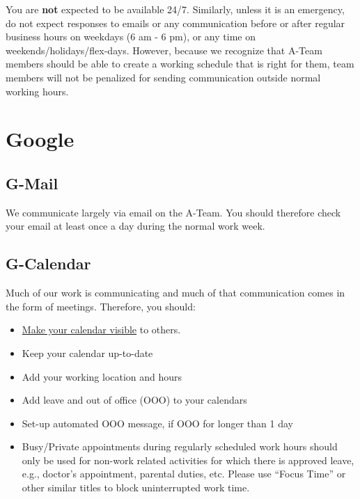 \documentclass[
  letterpaper,
  DIV=11,
  numbers=noendperiod]{scrreprt}
\providecommand{\tightlist}{%
  \setlength{\itemsep}{0pt}\setlength{\parskip}{0pt}}\usepackage{longtable,booktabs,array}
\begin{document}
You are \textbf{not} expected to be available 24/7. Similarly, unless it
is an emergency, do not expect responses to emails or any communication
before or after regular business hours on weekdays (6 am - 6 pm), or any
time on weekends/holidays/flex-days. However, because we recognize that
A-Team members should be able to create a working schedule that is right
for them, team members will not be penalized for sending communication
outside normal working hours.

\section{Google}\label{google}

\subsection{G-Mail}\label{g-mail}

We communicate largely via email on the A-Team. You should therefore
check your email at least once a day during the normal work week.

\subsection{G-Calendar}\label{g-calendar}

Much of our work is communicating and much of that communication comes
in the form of meetings. Therefore, you should:

\begin{itemize}
\tightlist
\item
  \hyperref[sec-calendar]{Make your calendar visible} to others.\\
\item
  Keep your calendar up-to-date\\
\item
  Add your working location and hours\\
\item
  Add leave and out of office (OOO) to your calendars\\
\item
  Set-up automated OOO message, if OOO for longer than 1 day\\
\item
  Busy/Private appointments during regularly scheduled work hours should
  only be used for non-work related activities for which there is
  approved leave, e.g., doctor's appointment, parental duties, etc.
  Please use ``Focus Time'' or other similar titles to block
  uninterrupted work time.
\end{itemize}
\end{document}
